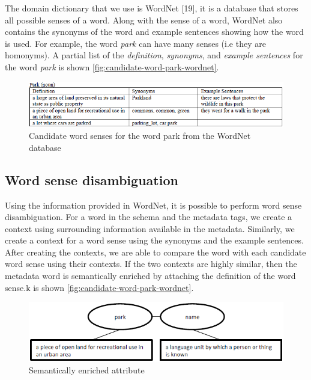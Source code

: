 The domain dictionary that we use is WordNet \cite{Fellbaum1998Computers}[19], it is a database that stores all possible senses of a word. Along with the sense of a word, WordNet also contains the synonyms of the word and example sentences showing how the word is used. For example, the word \textit{park} can have many senses (i.e they are homonyms). A partial list of the \textit{definition}, \textit{synonyms}, and \textit{example sentences} for the word \textit{park} is shown \autoref{fig:candidate-word-park-wordnet}.

\begin{figure}
    \centering
    \includegraphics[width=5in]{figures/candidate-word-park-wordnet.png}
    \caption{Candidate word senses for the word park from the WordNet database}
    \label{fig:candidate-word-park-wordnet}
\end{figure}

\subsection{Word sense disambiguation}

Using the information provided in WordNet, it is possible to perform word sense disambiguation. For a word in the schema and the metadata tags, we create a context using surrounding information available in the metadata. Similarly, we create a context for a word sense using the synonyms and the example sentences. After creating the contexts, we are able to compare the word with each candidate word sense using their contexts. If the two contexts are highly similar, then the metadata word is semantically enriched by attaching the definition of the word sense.k is shown \autoref{fig:candidate-word-park-wordnet}.

\begin{figure}
    \centering
    \includegraphics[width=5in]{figures/semantically-enriched-attribute.png}
    \caption{Semantically enriched attribute}
    \label{fig:semantically-enriched-attribute}
\end{figure}

